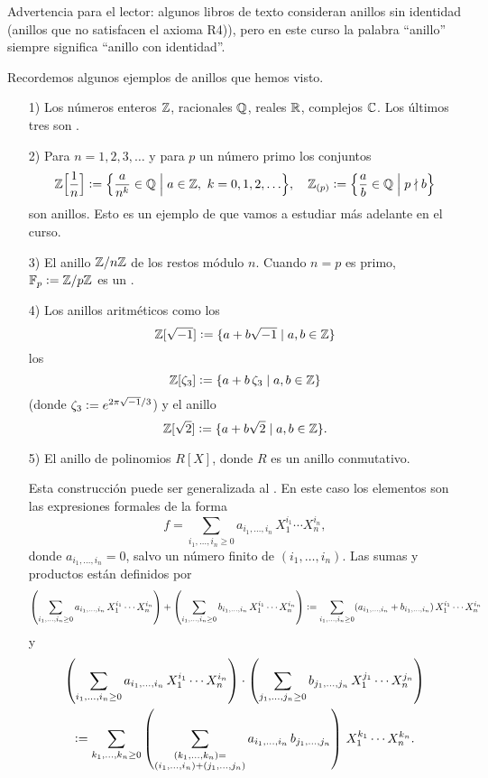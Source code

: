 Advertencia para el lector: algunos libros de texto consideran anillos
sin identidad (anillos que no satisfacen el axioma R4)), pero en este curso
la palabra ``anillo'' siempre significa ``anillo con identidad''.

\vspace{1em}

Recordemos algunos ejemplos de anillos que hemos visto.

\begin{enumerate}
\item[1)] Los números enteros $\mathbb{Z}$, racionales $\mathbb{Q}$, reales $\mathbb{R}$, complejos
  $\mathbb{C}$. Los últimos tres son .

\item[2)] Para $n = 1,2,3,\ldots$ y para $p$ un número primo los conjuntos
  \[ \mathbb{Z} \Bigl[\frac{1}{n}\Bigr] \mathrel{\mathop:}=
     \Bigl\{ \frac{a}{n^k}\in\mathbb{Q} \Bigm| a\in\mathbb{Z}, ~ k = 0,1,2,\ldots \Bigr\}, \quad
  \mathbb{Z}_{(p)} \mathrel{\mathop:}= \Bigl\{ \frac{a}{b} \in \mathbb{Q} \Bigm| p\nmid b \Bigr\} \]
  son anillos. Esto es un ejemplo de  que vamos a estudiar
  más adelante en el curso.

\item[3)] El anillo $\mathbb{Z}/n\mathbb{Z}$ de los restos módulo $n$. Cuando $n = p$
  es primo, $\mathbb{F}_p \mathrel{\mathop:}= \mathbb{Z}/p\mathbb{Z}$ es un .

\item[4)] Los anillos aritméticos como los 
  $$\mathbb{Z} [\sqrt{-1}] \mathrel{\mathop:}= \{ a + b\sqrt{-1} \mid a,b\in \mathbb{Z} \}$$
  los 
  $$\mathbb{Z} [\zeta_3] \mathrel{\mathop:}= \{ a + b\,\zeta_3 \mid a,b\in \mathbb{Z} \}$$
  (donde $\zeta_3 \mathrel{\mathop:}= e^{2\pi\sqrt{-1}/3}$) y el anillo
  $$\mathbb{Z} [\sqrt{2}] \mathrel{\mathop:}= \{ a + b\sqrt{2} \mid a,b\in \mathbb{Z} \}.$$

\item[5)] El anillo de polinomios $R [X]$, donde $R$ es un anillo conmutativo.

  Esta construcción puede ser generalizada al . En este caso
  los elementos son las expresiones formales de la forma
  $$f = \sum_{i_1,\ldots,i_n \ge 0} a_{i_1,\ldots,i_n}\,X_1^{i_1}\cdots X_n^{i_n},$$
  donde $a_{i_1,\ldots,i_n} = 0$, salvo un número finito de
  $(i_1,\ldots,i_n)$. Las sumas y productos están definidos por
  \[ \left(\sum_{i_1,\ldots,i_n \ge 0} a_{i_1,\ldots,i_n}\,X_1^{i_1}\cdots X_n^{i_n}\right) +
     \left(\sum_{i_1,\ldots,i_n \ge 0} b_{i_1,\ldots,i_n}\,X_1^{i_1}\cdots X_n^{i_n}\right) \mathrel{\mathop:}=
     \sum_{i_1,\ldots,i_n \ge 0} (a_{i_1,\ldots,i_n} + b_{i_1,\ldots,i_n})\,X_1^{i_1}\cdots X_n^{i_n} \]
  y
  \begin{multline*}
    \left(\sum_{i_1,\ldots,i_n \ge 0} a_{i_1,\ldots,i_n}\,X_1^{i_1}\cdots X_n^{i_n}\right) \cdot
    \left(\sum_{j_1,\ldots,j_n \ge 0} b_{j_1,\ldots,j_n}\,X_1^{j_1}\cdots X_n^{j_n}\right) \\
    \mathrel{\mathop:}= \sum_{k_1,\ldots,k_n \ge 0} \left(\sum_{\substack{(k_1,\ldots,k_n) = \\
    (i_1,\ldots,i_n) + (j_1,\ldots,j_n)}} a_{i_1,\ldots,i_n}\,b_{j_1,\ldots,j_n}\right)\,X_1^{k_1}\cdots X_n^{k_n}.
  \end{multline*}


\end{enumerate}
